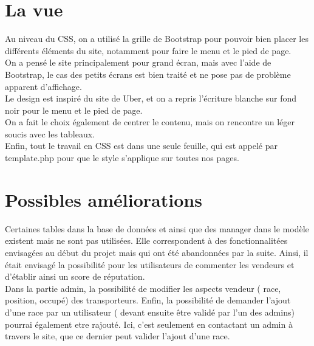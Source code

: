 \documentclass{article}
\begin{document}
\section{La vue}
Au niveau du CSS, on a utilisé la grille de Bootstrap pour pouvoir bien placer les différents éléments du site, notamment pour faire le menu et le pied de page.\\
On a pensé le site principalement pour grand écran, mais avec l'aide de Bootstrap, le cas des petits écrans est bien traité et ne pose pas de problème apparent d'affichage.\\
Le design est inspiré du site de Uber, et on a repris l'écriture blanche sur fond noir pour le menu et le pied de page.\\
On a fait le choix également de centrer le contenu, mais on rencontre un léger soucis avec les tableaux.\\
Enfin, tout le travail en CSS est dans une seule feuille, qui est appelé par template.php pour que le style s'applique sur toutes nos pages. 

\section{Possibles améliorations}
Certaines tables dans la base de données et ainsi que des manager dans le modèle existent mais ne sont pas utilisées. 
Elle correspondent à des fonctionnalitées envisagées au début du projet mais qui ont été abandonnées par la suite. 
Ainsi, il était envisagé la possibilité pour les utilisateurs de commenter les vendeurs et d'établir ainsi un score de réputation. 
\\
Dans la partie admin, la possibilité de modifier les aspects vendeur ( race, position, occupé) des transporteurs. 
Enfin, la possibilité de demander l'ajout d'une race par un utilisateur ( devant ensuite être validé par l'un des admins) pourrai également etre rajouté. 
Ici, c'est seulement en contactant un admin à travers le site, que ce dernier peut valider l'ajout d'une race. 
\end{document}
